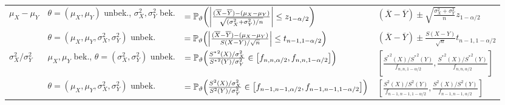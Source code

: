 \begin{landscape}
{\begin{tabular}{llll}
    \midrule
    $\mu_X - \mu_Y$ &
    $\theta = (\mu_X, \mu_Y)$ unbek., $\sigma_X^2, \sigma_Y^2$ bek. &
    $= \mathbb{P}_\vartheta\!\left(\left|\frac{(\overline{X} - \overline{Y}) - (\mu_X - \mu_Y)}
    {\sqrt{(\sigma_X^2 + \sigma_Y^2)/n}}\right| \le z_{1-\alpha/2}\right)$ &
    $(\overline{X} - \overline{Y}) \pm
    \sqrt{\frac{\sigma_X^2 + \sigma_Y^2}{n}} z_{1-\alpha/2}$\\
    \cmidrule(r){2-4}
    & $\theta = (\mu_X, \mu_Y, \sigma_X^2, \sigma_Y^2)$ unbek. &
    $= \mathbb{P}_\vartheta\!\left(\left|\frac{(\overline{X} - \overline{Y}) - (\mu_X - \mu_Y)}
    {S(X - Y)/\sqrt{n}}\right| \le t_{n-1,1-\alpha/2}\right)$ &
    $(\overline{X} - \overline{Y}) \pm
    \frac{S(X - Y)}{\sqrt{n}} t_{n-1,1-\alpha/2}$\\

    \midrule
    $\sigma_X^2/\sigma_Y^2$ &
    $\mu_X, \mu_Y$ bek., $\theta = (\sigma_X^2, \sigma_Y^2)$ unbek. &
    $= \mathbb{P}_\vartheta\!\left(\frac{{S^\ast}^2(X)/\sigma_X^2}{{S^\ast}^2(Y)/\sigma_Y^2} \in
    \left[f_{n,n,\alpha/2}, f_{n,n,1-\alpha/2}\right]\right)$ &
    $\left[\frac{{S^\ast}^2(X)/{S^\ast}^2(Y)}{f_{n,n,1-\alpha/2}},
    \frac{{S^\ast}^2(X)/{S^\ast}^2(Y)}{f_{n,n,\alpha/2}}\right]$\\
    \cmidrule(r){2-4}
    & $\theta = (\mu_X, \mu_Y, \sigma_X^2, \sigma_Y^2)$ unbek. &
    $= \mathbb{P}_\vartheta\!\left(\frac{S^2(X)/\sigma_X^2}{S^2(Y)/\sigma_Y^2} \in
    \left[f_{n-1,n-1,\alpha/2}, f_{n-1,n-1,1-\alpha/2}\right]\right)$ &
    $\left[\frac{S^2(X)/S^2(Y)}{f_{n-1,n-1,1-\alpha/2}},
    \frac{S^2(X)/S^2(Y)}{f_{n-1,n-1,\alpha/2}}\right]$\\

    \bottomrule
\end{tabular}}





\end{landscape}

